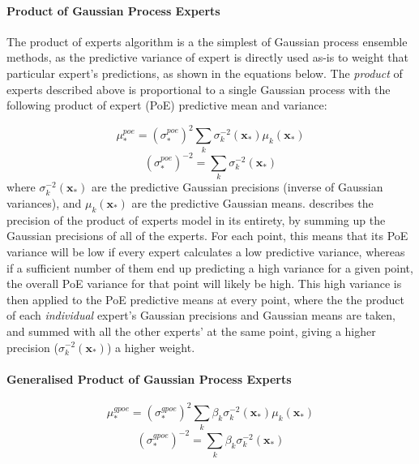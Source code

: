 \paragraph{Product of Gaussian Process Experts}
The product of experts algorithm is a the simplest of Gaussian process ensemble methods, as the predictive variance of expert is directly used as-is to weight that particular expert's predictions, as shown in the equations below. The \textit{product} of experts described above is proportional to a single Gaussian process with the following product of expert (PoE) predictive mean and variance:

\begin{equation}
    \mu_*^{poe} = (\sigma_*^{poe})^2 \sum_k \sigma_k^{-2} (\mathbf{x_*}) \mu_k (\mathbf{x_*})
\end{equation}
\begin{equation}\label{eq:poe-precision}
    (\sigma_*^{poe})^{-2} = \sum_k \sigma_k^{-2} (\mathbf{x_*})
\end{equation}
where $\sigma_k^{-2}(\mathbf{x_*})$ are the predictive Gaussian precisions (inverse of Gaussian variances), and $\mu_k(\mathbf{x_*})$ are the predictive Gaussian means.  describes the precision of the product of experts model in its entirety, by summing up the Gaussian precisions of all of the experts. For each point, this means that its PoE variance will be low if every expert calculates a low predictive variance, whereas if a sufficient number of them end up predicting a high variance for a given point, the overall PoE variance for that point will likely be high. This high variance is then applied to the PoE predictive means at every point, where the the product of each \textit{individual} expert's Gaussian precisions and Gaussian means are taken, and summed with all the other experts' at the same point, giving a higher precision ($\sigma_k^{-2}(\mathbf{x_*})$) a higher weight.

\paragraph{Generalised Product of Gaussian Process Experts}
\begin{equation}
    \mu_*^{gpoe} = (\sigma_*^{gpoe})^2 \sum_k \beta_k \sigma_k^{-2} (\mathbf{x_*}) \mu_k (\mathbf{x_*})
\end{equation}
\begin{equation}
    (\sigma_*^{gpoe})^{-2} = \sum_k \beta_k \sigma_k^{-2} (\mathbf{x_*})
\end{equation}

